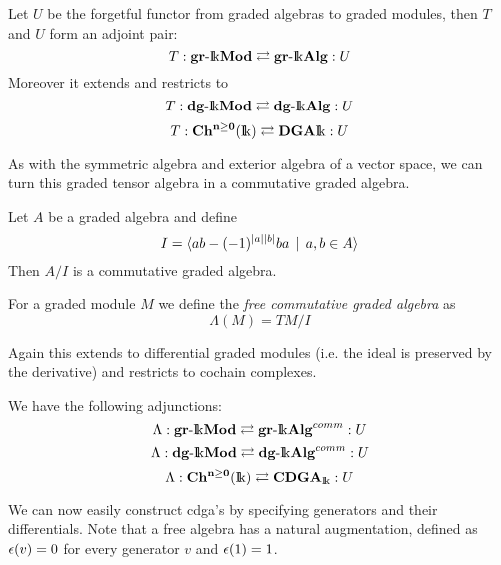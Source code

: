 \begin{corollary}
	Let $U$ be the forgetful functor from graded algebras to graded modules, then $T$ and $U$ form an adjoint pair:
	$$ T: \mathbf{gr\mbox{-}{\mathrm{I\!k}}Mod} \rightleftarrows \mathbf{gr\mbox{-}{\mathrm{I\!k}}Alg} :U $$
	Moreover it extends and restricts to
	$$ T: \mathbf{dg\mbox{-}{\mathrm{I\!k}}Mod} \rightleftarrows \mathbf{dg\mbox{-}{\mathrm{I\!k}}Alg} :U $$
	$$ T: \mathbf{Ch^{n\geq0}({\mathrm{I\!k}})} \rightleftarrows \mathbf{DGA}{\mathrm{I\!k}} :U $$
\end{corollary}

As with the symmetric algebra and exterior algebra of a vector space, we can turn this graded tensor algebra in a commutative graded algebra.

\begin{definition}
	Let $A$ be a graded algebra and define
	$$ I = \langle ab - (-1)^{{|{a}|}{|{b}|}}b a \,\mid\, a,b \in A \rangle $$
	Then $A / I$ is a commutative graded algebra.

	For a graded module $M$ we define the \emph{free commutative graded algebra} as
	$$ \Lambda(M) = TM / I $$
\end{definition}

Again this extends to differential graded modules (i.e. the ideal is preserved by the derivative) and restricts to cochain complexes.

\begin{lemma}
	We have the following adjunctions:
	$$ \Lambda: \mathbf{gr\mbox{-}{\mathrm{I\!k}}Mod} \rightleftarrows \mathbf{gr\mbox{-}{\mathrm{I\!k}}Alg}^{comm} :U $$
	$$ \Lambda: \mathbf{dg\mbox{-}{\mathrm{I\!k}}Mod} \rightleftarrows \mathbf{dg\mbox{-}{\mathrm{I\!k}}Alg}^{comm} :U $$
	$$ \Lambda: \mathbf{Ch^{n\geq0}({\mathrm{I\!k}})} \rightleftarrows \mathbf{CDGA}_{\mathrm{I\!k}} :U $$
\end{lemma}

We can now easily construct cdga's by specifying generators and their differentials. Note that a free algebra has a natural augmentation, defined as $\epsilon(v) = 0$ for every generator $v$ and $\epsilon(1) = 1$.
